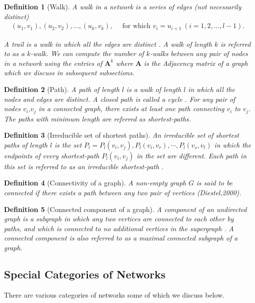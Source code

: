 \documentclass[10pt,a4paper]{article}
\newtheorem{defn}{Definition}
\begin{document}
\begin{defn}[Walk]
	A walk in a network is a series of edges (not necessarily distinct)
	\begin{eqnarray*}
		(u_1,v_1),(u_2,v_2),\ldots,(u_k,v_k),\quad \text{ for which }  v_i=u_{i+1} ~(i=1,2,\ldots,l-1).
	\end{eqnarray*}

 A trail is a walk in which all the edges are distinct \citep{estrada2015first}. A walk of length $k$ is referred to as a $k$-walk. We can compute the number of $k$-walks between any pair of nodes in a network using the entries of $\mathbf{A}^k$ where $\mathbf{A}$ is the Adjacency matrix of a graph which we discuss in subsequent subsections.
\end{defn}

\begin{defn}[Path]
	A path of length $l$ is a walk of length $l$ in which all the nodes and edges are distinct. A closed path is called a cycle \citep{estrada2011structure}. For any pair of nodes $v_i$,$v_j$ in a connected graph, there exists at least one path connecting $v_i$ to $v_j$. The paths with minimum length are referred as shortest-paths.
\end{defn}

\begin{defn}[Irreducible set of shortest paths]
	
	An irreducible set of shortest paths of length $l$ is the set $P_l ={P_l(v_i,v_j),P_l(v_i,v_r),\cdots, P_l(v_s,v_t)}$ in which the endpoints of every shortest-path $P_l(v_i,v_j)$ in the set are different.
	Each path in this set is referred to as an irreducible shortest-path \citep{estrada2012path}.\end{defn}


\begin{defn}[Connectivity of a graph]
	A non-empty graph $G$ is said to be connected if there exists a path between any two pair of vertices (Diestel,2000). 
\end{defn}

\begin{defn}[Connected component of a graph]
	A component of an undirected graph is a subgraph in which any two vertices are connected to each other by paths, and which is connected to no additional vertices in the supergraph \citep{newman2010networks}. 
	A connected component is also referred to as a maximal connected subgraph of a graph.
\end{defn}


\subsection{Special Categories of Networks}
There are various categories of networks some of which we discuss below.
\end{document}
